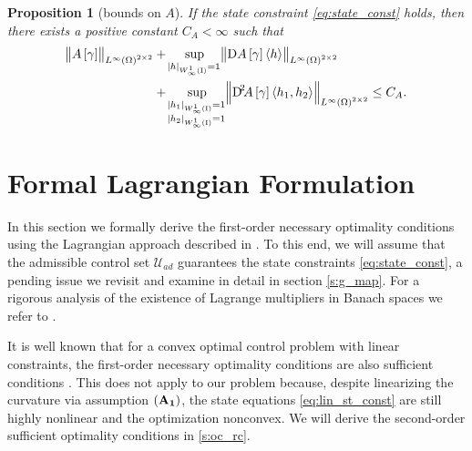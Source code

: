 \documentclass[final]{siamltex}
\newtheorem{prop}[theorem]{Proposition}
\begin{document}
\begin{prop}[bounds on $A$] \label{prop:op_A}
If the state constraint \eqref{eq:state_const} holds, then there exists a positive constant $C_A < \infty$ such that
\begin{equation}\begin{aligned}  \label{eq:A_unif_bound}
    \norm{A\sbr\gamma}_{L^\infty\del{\Omega}^{2\times 2}}
    	&+ \sup_{{\abs{{h}}_{{W^{{1}}_{{\infty}}\del{{\text{\rm I}}}}}}=1}\norm{\Dif A\sbr\gamma{\langle {h} \rangle}}_{L^\infty\del{\Omega}^{2\times 2}} \\	&+ \sup_{\substack{{\abs{{h_1}}_{{W^{{1}}_{{\infty}}\del{{\text{\rm I}}}}}} = 1 \\ {\abs{{h_2}}_{{W^{{1}}_{{\infty}}\del{{\text{\rm I}}}}}} = 1}}\norm{\Dif^2 \!\! A\sbr{\gamma}{\langle {h_1,h_2} \rangle}}_{L^\infty\del{\Omega}^{2\times 2}} \leq C_A.
\end{aligned}\end{equation}    
\end{prop}

\section{Formal Lagrangian Formulation}
\label{s:oc_lagrangian}

In this section we formally derive  
the first-order necessary optimality conditions using the Lagrangian approach described in
\cite{FTroltzsch_2010a}. To this end, we will assume that the admissible control set ${{\mathcal{U}_{ad}}}$ 
guarantees the state constraints \eqref{eq:state_const}, a pending issue we revisit and 
examine in detail in section \ref{s:g_map}.
For a rigorous analysis of the existence of Lagrange multipliers in Banach spaces we 
refer to \cite{JZowe_SKurcyusz_1979a}.
 
It is well known that for a convex optimal control problem with linear
constraints, the first-order necessary optimality conditions are also sufficient conditions 
\cite[Lemma 2.21]{FTroltzsch_2010a}. This does not apply to our problem because, despite 
linearizing the curvature via assumption {$(\bf A_1)$}, the state equations \eqref{eq:lin_st_const} are still highly nonlinear and the optimization nonconvex. We will  derive the second-order sufficient optimality conditions in  \autoref{s:oc_rc}. 
\end{document}
